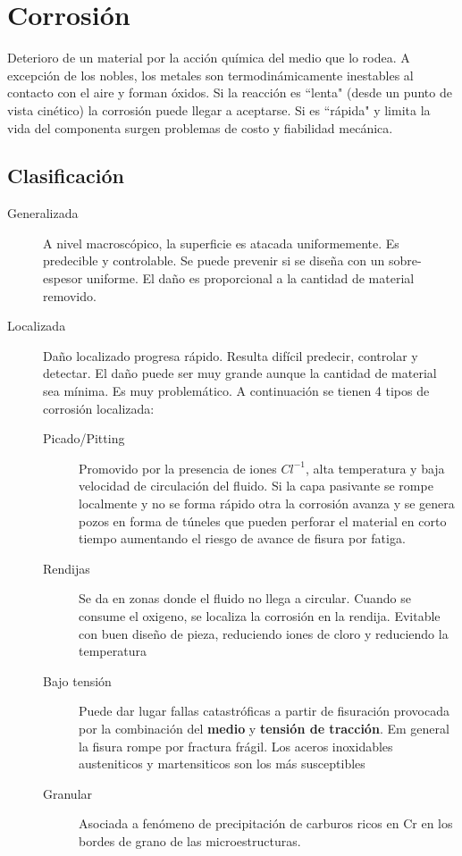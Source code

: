 \documentclass{article}
\begin{document}
\section{Corrosión}
Deterioro de un material por la acción química del medio que lo rodea. A excepción de los nobles, los metales son termodinámicamente inestables al contacto con el aire y forman óxidos. Si la reacción es ``lenta"{} (desde un punto de vista cinético) la corrosión puede llegar a aceptarse. Si es ``rápida"{} y limita la vida del componenta surgen problemas de costo y fiabilidad mecánica.

\subsection{Clasificación}
\begin{description}
	\item[Generalizada] A nivel macroscópico, la superficie es atacada uniformemente. Es predecible y controlable. Se puede prevenir si se diseña con un sobre-espesor uniforme. El daño es proporcional a la cantidad de material removido.
	\item[Localizada] Daño localizado progresa rápido. Resulta difícil predecir, controlar y detectar. El daño puede ser muy grande aunque la cantidad de material sea mínima. Es muy problemático. A continuación se tienen 4 tipos de corrosión localizada:
	\begin{description}
		\item[Picado/Pitting] Promovido por la presencia de iones $Cl^{-1}$, alta temperatura y baja velocidad de circulación del fluido. Si la capa pasivante se rompe localmente y no se forma rápido otra la corrosión avanza y se genera pozos en forma de túneles que pueden perforar el material en corto tiempo aumentando el riesgo de avance de fisura por fatiga.
		\item[Rendijas] Se da en zonas donde el fluido no llega a circular. Cuando se consume el oxigeno, se localiza la corrosión en la rendija. Evitable con buen diseño de pieza, reduciendo iones de cloro y reduciendo la temperatura
		\item[Bajo tensión] Puede dar lugar  fallas catastróficas a partir de fisuración provocada por la combinación del \textbf{medio} y \textbf{tensión de tracción}. Em general la fisura rompe por fractura frágil. Los aceros inoxidables austeniticos y martensiticos son los más susceptibles
		\item[Granular] Asociada a fenómeno de precipitación de carburos ricos en Cr en los bordes de grano de las microestructuras.
	\end{description}
\end{description}
\end{document}
